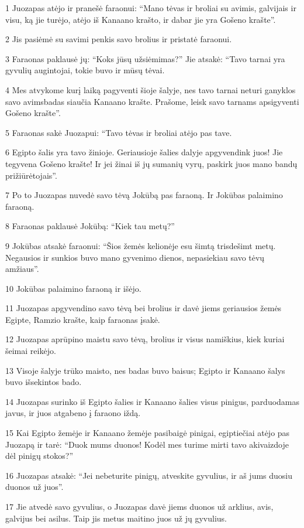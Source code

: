 \par 1 Juozapas atėjo ir pranešė faraonui: “Mano tėvas ir broliai su avimis, galvijais ir visu, ką jie turėjo, atėjo iš Kanaano krašto, ir dabar jie yra Gošeno krašte”. 
\par 2 Jis pasiėmė su savimi penkis savo brolius ir pristatė faraonui. 
\par 3 Faraonas paklausė jų: “Koks jūsų užsiėmimas?” Jie atsakė: “Tavo tarnai yra gyvulių augintojai, tokie buvo ir mūsų tėvai. 
\par 4 Mes atvykome kurį laiką pagyventi šioje šalyje, nes tavo tarnai neturi ganyklos savo avims­badas siaučia Kanaano krašte. Prašome, leisk savo tarnams apsigyventi Gošeno krašte”. 
\par 5 Faraonas sakė Juozapui: “Tavo tėvas ir broliai atėjo pas tave. 
\par 6 Egipto šalis yra tavo žinioje. Geriausioje šalies dalyje apgyvendink juos! Jie tegyvena Gošeno krašte! Ir jei žinai iš jų sumanių vyrų, paskirk juos mano bandų prižiūrėtojais”. 
\par 7 Po to Juozapas nuvedė savo tėvą Jokūbą pas faraoną. Ir Jokūbas palaimino faraoną. 
\par 8 Faraonas paklausė Jokūbą: “Kiek tau metų?” 
\par 9 Jokūbas atsakė faraonui: “Šios žemės kelionėje esu šimtą trisdešimt metų. Negausios ir sunkios buvo mano gyvenimo dienos, nepasiekiau savo tėvų amžiaus”. 
\par 10 Jokūbas palaimino faraoną ir išėjo. 
\par 11 Juozapas apgyvendino savo tėvą bei brolius ir davė jiems geriausios žemės Egipte, Ramzio krašte, kaip faraonas įsakė. 
\par 12 Juozapas aprūpino maistu savo tėvą, brolius ir visus namiškius, kiek kuriai šeimai reikėjo. 
\par 13 Visoje šalyje trūko maisto, nes badas buvo baisus; Egipto ir Kanaano šalys buvo išsekintos bado. 
\par 14 Juozapas surinko iš Egipto šalies ir Kanaano šalies visus pinigus, parduodamas javus, ir juos atgabeno į faraono iždą. 
\par 15 Kai Egipto žemėje ir Kanaano žemėje pasibaigė pinigai, egiptiečiai atėjo pas Juozapą ir tarė: “Duok mums duonos! Kodėl mes turime mirti tavo akivaizdoje dėl pinigų stokos?” 
\par 16 Juozapas atsakė: “Jei nebeturite pinigų, atveskite gyvulius, ir aš jums duosiu duonos už juos”. 
\par 17 Jie atvedė savo gyvulius, o Juozapas davė jiems duonos už arklius, avis, galvijus bei asilus. Taip jis metus maitino juos už jų gyvulius. 
